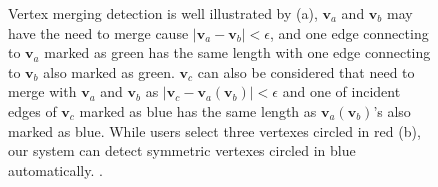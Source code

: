 \begin{figure}
	\centering
	 \hfill
	 \hfill
	 
	 \caption{Vertex merging detection is well illustrated by (a), $\mathbf{v}_a$ and $\mathbf{v}_b$ may have the need to merge cause $|\mathbf{v}_a-\mathbf{v}_b|<\epsilon$, and one edge connecting to $\mathbf{v}_a$ marked as green has the same length with one edge connecting to $\mathbf{v}_b$ also marked as green. $\mathbf{v}_c$ can also be considered that need to merge with $\mathbf{v}_a$ and $\mathbf{v}_b$ as $|\mathbf{v}_c-\mathbf{v}_a(\mathbf{v}_b)|<\epsilon$ and one of incident edges of $\mathbf{v}_c$ marked as blue has the same length as $\mathbf{v}_a(\mathbf{v}_b)$'s also marked as blue. While users select three vertexes circled in red (b), our system can detect symmetric vertexes circled in blue automatically. .}
	 \label{fig:suggestion}
\end{figure}

